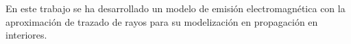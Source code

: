 En este trabajo se ha desarrollado un modelo de emisión electromagnética con la aproximación de trazado de rayos para su modelización en propagación en interiores.